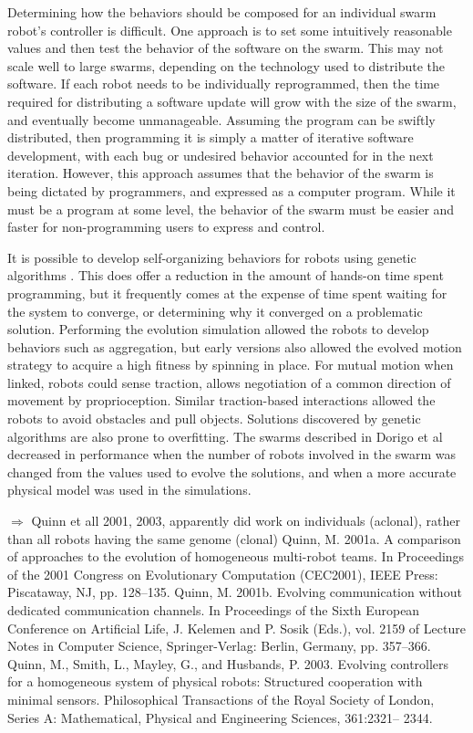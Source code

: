 \documentclass[]{article}
\begin{document}
Determining how the behaviors should be composed for an individual swarm robot's controller is difficult. 
One approach is to set some intuitively reasonable values and then test the behavior of the software on the swarm. 
This may not scale well to large swarms, depending on the technology used to distribute the software. 
If each robot needs to be individually reprogrammed, then the time required for distributing a software update will grow with the size of the swarm, and eventually become unmanageable. 
Assuming the program can be swiftly distributed, then programming it is simply a matter of iterative software development, with each bug or undesired behavior accounted for in the next iteration. 
However, this approach assumes that the behavior of the swarm is being dictated by programmers, and expressed as a computer program. 
While it must be a program at some level, the behavior of the swarm must be easier and faster for non-programming users to express and control. 

It is possible to develop self-organizing behaviors for robots using genetic algorithms \cite{dorigo2004evolving}. 
This does offer a reduction in the amount of hands-on time spent programming, but it frequently comes at the expense of time spent waiting for the system to converge, or determining why it converged on a problematic solution. 
Performing the evolution simulation allowed the robots to develop behaviors such as aggregation, but early versions also allowed the evolved motion strategy to acquire a high fitness by spinning in place. 
For mutual motion when linked, robots could sense traction, allows negotiation of a common direction of movement by proprioception. 
Similar traction-based interactions allowed the robots to avoid obstacles and pull objects. 
Solutions discovered by genetic algorithms are also prone to overfitting. 
The swarms described in Dorigo et al decreased in performance when the number of robots involved in the swarm was changed from the values used to evolve the solutions, and when a more accurate physical model was used in the simulations.

$\Rightarrow$ Quinn et all 2001, 2003, apparently did work on individuals (aclonal), rather than all robots having the same genome (clonal) Quinn, M. 2001a. A comparison of approaches to the evolution of homogeneous multi-robot teams. In Proceedings of the 2001 Congress on Evolutionary Computation (CEC2001), IEEE Press: Piscataway, NJ, pp. 128–135.
Quinn, M. 2001b. Evolving communication without dedicated communication channels. In Proceedings of the Sixth European Conference on Artificial Life, J. Kelemen and P. Sosik (Eds.), vol. 2159 of Lecture Notes in Computer Science, Springer-Verlag: Berlin, Germany, pp. 357–366.
Quinn, M., Smith, L., Mayley, G., and Husbands, P. 2003. Evolving controllers for a homogeneous system of physical robots: Structured cooperation with minimal sensors. Philosophical Transactions of the Royal Society of London, Series A: Mathematical, Physical and Engineering Sciences, 361:2321– 2344.
\end{document}
